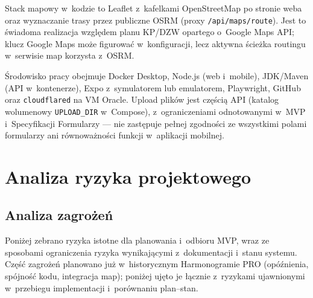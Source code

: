 \documentclass{sprz}
\begin{document}
Stack mapowy w~kodzie to Leaflet z~kafelkami OpenStreetMap po stronie weba oraz wyznaczanie trasy przez publiczne OSRM (proxy \texttt{/api/\allowbreak maps/\allowbreak route}). Jest to świadoma realizacja względem planu KP/DZW opartego o~Google Maps API; klucz Google Maps może figurować w~konfiguracji, lecz aktywna ścieżka routingu w~serwisie map korzysta z~OSRM.

Środowisko pracy obejmuje Docker Desktop, Node.js
(web i~mobile), JDK/\allowbreak Maven (API w~kontenerze),
Expo z~symulatorem lub emulatorem, Playwright, GitHub
oraz \texttt{cloudflared} na VM Oracle.
Upload plików jest częścią API
(katalog wolumenowy \texttt{UPLOAD\_DIR} w~Compose),
z~ograniczeniami odnotowanymi w~MVP i~Specyfikacji Formularzy ---
nie zastępuje pełnej zgodności ze wszystkimi polami formularzy
ani równoważności funkcji w~aplikacji mobilnej.

\section{Analiza ryzyka projektowego}
\subsection{Analiza zagrożeń}

Poniżej zebrano ryzyka istotne dla planowania i~odbioru MVP, wraz ze sposobami ograniczenia ryzyka wynikającymi z~dokumentacji i~stanu systemu. Część zagrożeń planowano już w~historycznym Harmonogramie PRO (opóźnienia, spójność kodu, integracja map); poniżej ujęto je łącznie z~ryzykami ujawnionymi w~przebiegu implementacji i~porównaniu plan--stan.
\end{document}

